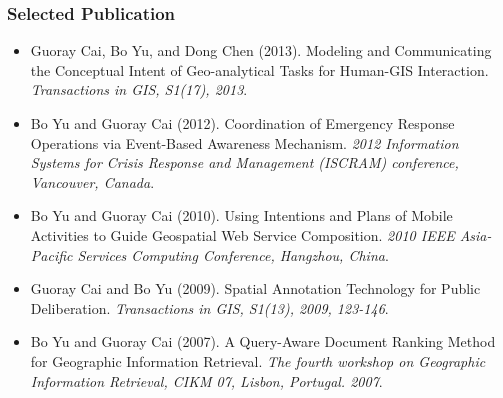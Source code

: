 \subsubsection*{Selected Publication} %
\label{ssub:selected_publication}
\begin{itemize}
	\item Guoray Cai, Bo Yu, and Dong Chen (2013). Modeling and Communicating the Conceptual Intent of Geo-analytical Tasks for Human-GIS Interaction. \emph{Transactions in GIS, S1(17), 2013}.
	\item Bo Yu and Guoray Cai (2012). Coordination of Emergency Response Operations via Event-Based Awareness Mechanism. \emph{2012 Information Systems for Crisis Response and Management (ISCRAM) conference, Vancouver, Canada}.
	\item Bo Yu and Guoray Cai (2010). Using Intentions and Plans of Mobile Activities to Guide Geospatial Web Service Composition. \emph{2010 IEEE Asia-Pacific Services Computing Conference, Hangzhou, China}.
	\item Guoray Cai and Bo Yu (2009). Spatial Annotation Technology for Public Deliberation. \emph{Transactions in GIS, S1(13), 2009, 123-146}.
	\item Bo Yu and Guoray Cai (2007). A Query-Aware Document Ranking Method for Geographic Information Retrieval. \emph{The fourth workshop on Geographic Information Retrieval, CIKM 07, Lisbon, Portugal. 2007}.
\end{itemize}



